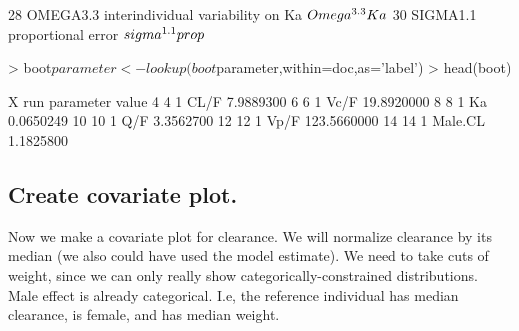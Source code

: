 \begin{Schunk}
\begin{Soutput}
28  OMEGA3.3             interindividual variability on Ka   $\\Omega^{3.3}Ka$
30  SIGMA1.1                            proportional error $\\sigma^{1.1}prop$
\end{Soutput}
\begin{Sinput}
> boot$parameter <- lookup(boot$parameter,within=doc,as='label')
> head(boot)
\end{Sinput}
\begin{Soutput}
    X run parameter       value
4   4   1      CL/F   7.9889300
6   6   1      Vc/F  19.8920000
8   8   1        Ka   0.0650249
10 10   1       Q/F   3.3562700
12 12   1      Vp/F 123.5660000
14 14   1   Male.CL   1.1825800
\end{Soutput}
\end{Schunk}
\subsection{Create covariate plot.}
Now we make a covariate plot for clearance.  We will normalize clearance 
by its median (we also could have used the model estimate).  We need to take 
cuts of weight, since we can only really show categorically-constrained distributions.
Male effect is already categorical.  I.e, the reference individual has median
clearance, is female, and has median weight.
